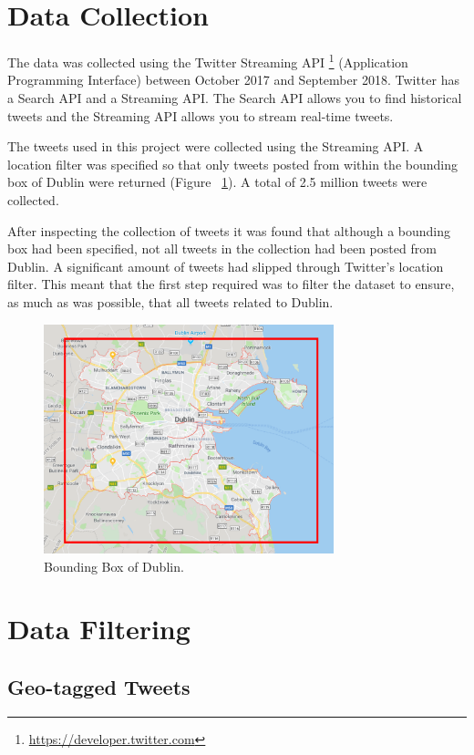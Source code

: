 \section{Data Collection}
The data was collected using the Twitter Streaming API \footnote{\url{https://developer.twitter.com}} (Application Programming Interface) between October 2017 and September 2018. Twitter has a Search API and a Streaming API. The Search API allows you to find historical tweets and the Streaming API allows you to stream real-time tweets.

The tweets used in this project were collected using the Streaming API. A location filter was specified so that only tweets posted from within the bounding box of Dublin were returned (Figure ~\ref{fig:dublinBB}). A total of 2.5 million tweets were collected.

After inspecting the collection of tweets it was found that although a bounding box had been specified, not all tweets in the collection had been posted from Dublin. A significant amount of tweets had slipped through Twitter's location filter. This meant that the first step required was to filter the dataset to ensure, as much as was possible, that all tweets related to Dublin.

\begin{figure}[h!]
\centering
\includegraphics[width=0.75\textwidth]{design_and_methodology/dublinBB.png}
\caption{\label{fig:dublinBB} Bounding Box of Dublin.}
\end{figure}

\section{Data Filtering}

\subsection{Geo-tagged Tweets}

